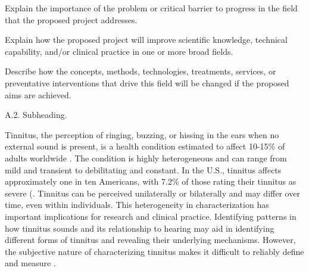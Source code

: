 \documentclass[11pt, notitlepage]{article} %
\begin{document}
Explain the importance of the problem or critical barrier to progress in the field that the proposed project addresses.

Explain how the proposed project will improve scientific knowledge, technical capability, and/or clinical practice in one or more broad fields.

Describe how the concepts, methods, technologies, treatments, services, or preventative interventions that drive this field will be changed if the proposed aims are achieved.

\begin{description}
	\item[A.2. Subheading.]{}
\end{description}

Tinnitus, the perception of ringing, buzzing, or hissing in the ears when no external sound is present,
is a health condition estimated to affect 10-15\% of adults worldwide \cite{henryTinnitusEpidemiologicPerspective2020}.
The condition is highly heterogeneous and can range from mild and transient to debilitating and constant.
In the U.S., tinnitus affects approximately one in ten Americans, with 7.2\% of those rating their tinnitus as severe (\cite{bhattPrevalenceSeverityExposures2016}.
Tinnitus can be perceived unilaterally or bilaterally and may differ over time, even within individuals.
This heterogeneity in characterization has important implications for research
and clinical practice.
Identifying patterns in how tinnitus sounds and its relationship to hearing may aid in identifying
different forms of tinnitus and revealing their underlying mechanisms.
However, the subjective nature of characterizing tinnitus makes it difficult
to reliably define and measure \cite{vajsakovicPrinciplesMethodsPsychoacoustic2021}.
\end{document}
